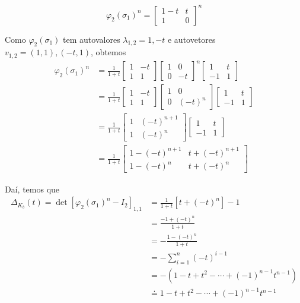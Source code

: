 	\begin{equation*}
	\varphi_2(\sigma_1)^n = \begin{bmatrix}
	1-t & t \\
	1 & 0
	\end{bmatrix}^n
	\end{equation*}
	\par\vspace{0.3cm} Como $\varphi_2(\sigma_1)$ tem autovalores $\lambda_{1,2} = 1, -t$ e autovetores $v_{1,2} = (1,1), (-t,1)$, obtemos
	\begin{align*}
	\varphi_2(\sigma_1)^n &= \frac{1}{1+t}\begin{bmatrix}
	1 & -t \\
	1 & 1
	\end{bmatrix}\begin{bmatrix}
	1 & 0 \\
	0 & -t
	\end{bmatrix}^n\begin{bmatrix}
	1 & t \\
	-1 & 1
	\end{bmatrix} \\
	&= \frac{1}{1+t}\begin{bmatrix}
	1 & -t \\
	1 & 1
	\end{bmatrix}\begin{bmatrix}
	1 & 0 \\
	0 & (-t)^n
	\end{bmatrix}\begin{bmatrix}
	1 & t \\
	-1 & 1
	\end{bmatrix} \\
	&= \frac{1}{1+t}\begin{bmatrix}
	1 & (-t)^{n+1} \\
	1 & (-t)^n
	\end{bmatrix}\begin{bmatrix}
	1 & t \\
	-1 & 1
	\end{bmatrix} \\
	&= \frac{1}{1+t}\begin{bmatrix}
	1 - (-t)^{n+1} & t + (-t)^{n+1} \\
	1 - (-t)^n & t + (-t)^n
	\end{bmatrix}
	\end{align*}
	\par\vspace{0.3cm} Daí, temos que
	\begin{align*}
	\Delta_{K_b}(t) = \det[\varphi_2(\sigma_1)^n - I_2]_{1,1} &= \frac{1}{1+t}[t+(-t)^n] - 1 \\
	&= \frac{-1 + (-t)^n}{1+t} \\
	&= -\frac{1 - (-t)^n}{1+t} \\
	&= -\sum_{i=1}^{n}(-t)^{i-1} \\
	&= -(1-t+t^2-\cdots+(-1)^{n-1}t^{n-1}) \\
	&\doteq 1-t+t^2-\cdots+(-1)^{n-1}t^{n-1} 
	\end{align*}
